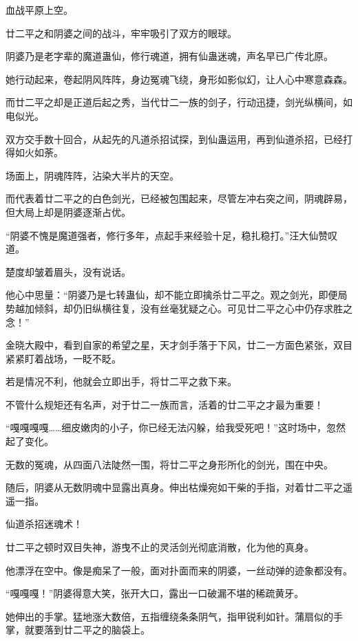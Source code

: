
\begin{this_body}



血战平原上空。

廿二平之和阴婆之间的战斗，牢牢吸引了双方的眼球。

阴婆乃是老字辈的魔道蛊仙，修行魂道，拥有仙蛊迷魂，声名早已广传北原。

她行动起来，卷起阴风阵阵，身边冤魂飞绕，身形如影似幻，让人心中寒意森森。

而廿二平之却是正道后起之秀，当代廿二一族的剑子，行动迅捷，剑光纵横间，如电似光。

双方交手数十回合，从起先的凡道杀招试探，到仙蛊运用，再到仙道杀招，已经打得如火如荼。

场面上，阴魂阵阵，沾染大半片的天空。

而代表着廿二平之的白色剑光，已经被包围起来，尽管左冲右突之间，阴魂辟易，但大局上却是阴婆逐渐占优。

“阴婆不愧是魔道强者，修行多年，点起手来经验十足，稳扎稳打。”汪大仙赞叹道。

楚度却皱着眉头，没有说话。

他心中思量：“阴婆乃是七转蛊仙，却不能立即擒杀廿二平之。观之剑光，即便局势越加倾斜，却仍旧纵横往复，没有丝毫犹疑之心。可见廿二平之心中仍存求胜之念！”

金晓大殿中，看到自家的希望之星，天才剑手落于下风，廿二一方面色紧张，双目紧紧盯着战场，一眨不眨。

若是情况不利，他就会立即出手，将廿二平之救下来。

不管什么规矩还有名声，对于廿二一族而言，活着的廿二平之才最为重要！

“嘎嘎嘎嘎……细皮嫩肉的小子，你已经无法闪躲，给我受死吧！”这时场中，忽然起了变化。

无数的冤魂，从四面八法陡然一围，将廿二平之身形所化的剑光，围在中央。

随后，阴婆从无数阴魂中显露出真身。伸出枯燥宛如干柴的手指，对着廿二平之遥遥一指。

仙道杀招迷魂术！

廿二平之顿时双目失神，游曳不止的灵活剑光彻底消散，化为他的真身。

他漂浮在空中。像是痴呆了一般，面对扑面而来的阴婆，一丝动弹的迹象都没有。

“嘎嘎嘎！”阴婆得意大笑，张开大口，露出一口破漏不堪的稀疏黄牙。

她伸出的手掌。猛地涨大数倍，五指缠绕条条阴气，指甲锐利如针。蒲扇似的手掌，就要落到廿二平之的脑袋上。


\end{this_body}
